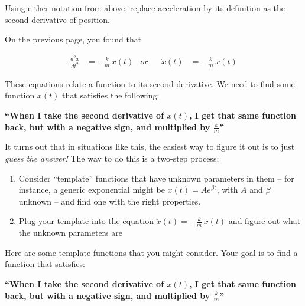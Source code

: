 \documentclass[12pt]{article}
\begin{document}
\vspace{0.3in}

Using either notation from above, replace acceleration by its definition as the second derivative of position. 

\newpage

On the previous page, you found that

\begin{align*}
\frac{d^2 x}{dt^2} &= -\frac{k}{m}\,x(t) &or&& \ddot x(t) &= -\frac{k}{m}\,x(t) 
\end{align*}

These equations relate a function to its second derivative. We need to find some function $x(t)$ that satisfies the following:

\large \bf ``When I take the second derivative of $x(t)$, I get that same function back, but with a negative sign, and multiplied by $\frac{k}{m}$'' \rm \normalsize

It turns out that in situations like this, the easiest way to figure it out is to just {\it guess the answer!} The way to do this is a two-step process:

\begin{enumerate}
	\item Consider ``template'' functions that have unknown parameters in them -- for instance, a generic exponential might be $x(t) = Ae^{\beta t}$, with $A$ and $\beta$ unknown -- and find one with the right properties.
	\item Plug your template into the equation $\ddot x(t) = -\frac{k}{m}\, x(t)$ and figure out what the unknown parameters are
\end{enumerate}

\vspace{0.5in}

\newpage

Here are some template functions that you might consider. Your goal is to find a function that satisfies:


\large \bf ``When I take the second derivative of $x(t)$, I get that same function back, but with a negative sign, and multiplied by $\frac{k}{m}$'' \rm \normalsize
\end{document}
